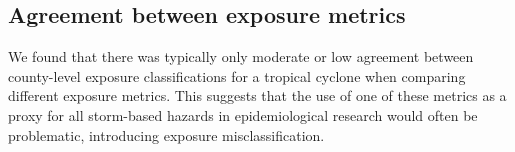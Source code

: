 \begin{comment}
However, these frequency maps, together with evidence from
specific tropical cyclones (Figures~\ref{fig:ivanexposure}
and~\ref{fig:jaccard}),  do illustrate the potential for strong differences in
spatial patterns in tropical cyclone exposures, depending on which tropical
cyclone hazards are considered.  A few previous studies have sought to
determine county-level exposure to tropical cyclones over multi-year periods,
including~\textcite{zandbergen2009}, which estimated exposure in \ac{US}
counties to all \ac{US} landfalling Atlantic-basin tropical cyclones
between~1851 and~2003, using both a distance-based metric and a metric that
combined distance and windspeed, and~\textcite{kruk2010}, which explored
exposure to hurricane-related winds in the \ac{US}, including inland areas,
for~1900\,--\,2008.  Our results suggest that such exposure assessments may
perform well in capturing some tropical cyclone hazards (e.g., wind), but
likely miss other potentially dangerous tropical cyclone exposures, especially
for hazards that repeatedly threaten northern or inland counties (e.g., rain,
flooding).
\end{comment}

\subsection*{Agreement between exposure metrics}

We found that there was typically only moderate or low agreement between
county-level exposure classifications for a tropical cyclone when comparing
different exposure metrics. This suggests that the use of one of these metrics
as a proxy for all storm-based hazards in epidemiological research would often
be problematic, introducing exposure misclassification.

\begin{comment}
For example, distance from a tropical cyclone's track is relatively easy to
measure and has been used as an operational metric of exposure to tropical
cyclones in previous large-scale studies (examples include ...). Since distance
itself does not constitute a hazard, distance is meant in these cases as a
surrogate to capture exposure to hazards from the tropical cyclone. However,
here we found that in assessing \ac{US} county-level exposure to tropical
cyclones, distance is, at best, a moderate, and often a very poor, surrogate
for exposure to the specific tropical cyclone hazards of high wind, extreme
rainfall, flooding, and tornadoes (Figure~\ref{fig:jaccard}). Therefore, use of
distance to assess tropical cyclone exposure for impact studies could result in
problematic exposure misclassification, which could mask true associations,
even strong associations, between tropical cyclone exposure and outcomes of
interest in impact studies~\parencite{savitz2016interpreting,
armstrong1998effect}.  
\end{comment}

